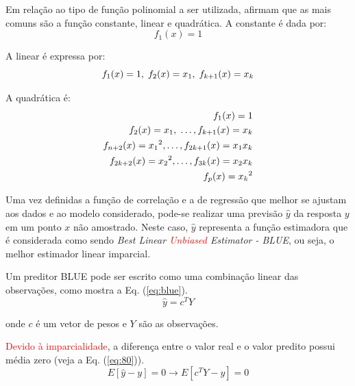 Em relação ao tipo de função polinomial a ser utilizada,  afirmam que as mais comuns são a função constante, linear e quadrática. A constante é dada por:
\begin{equation}
{f}_1({x}) = 1
\label{eq:24}
\end{equation}

A linear é expressa por:
\begin{equation}
{f}_1(x) = 1, \hspace{0.1 cm} {f}_2(x) ={x}_1, \hspace{0.1 cm} {f}_{k+1}(x) ={x}_k
\label{eq:25}
\end{equation}

A quadrática é:
\begin{equation}
\begin{split}
{f}_1(x) = 1\\
{f}_2(x) = {x}_1, \hspace{0.1 cm}  \ldots, {f}_{k+1}(x) = {x}_k\\
{f}_{n+2}(x) = {{x}_1}^2,  \ldots,  {f}_{2k+1}(x) = {x}_1 {x}_k\\
{f}_{2k+2}(x) = {{x}_2}^2,  \ldots, {f}_{3k}(x) = {x}_2 {x}_k \\
{f}_{p}(x) = {{x}_k}^2
\label{eq:30}
\end{split}
\end{equation}

Uma vez definidas a função de correlação e a de regressão que melhor se ajustam aos dados e ao modelo considerado, pode-se realizar uma previsão $\hat{y}$ da resposta $y$ em um ponto $x$ não amostrado. Neste caso, $\hat{y}$ representa a função estimadora que é considerada como sendo {\it Best Linear \textcolor{red}{Unbiased} Estimator - BLUE}, ou seja, o  melhor estimador linear imparcial.

Um preditor BLUE pode ser escrito como uma combinação linear das observações, como mostra a Eq. (\ref{eq:blue}).
\begin{equation}
\hat{y}= {c}^TY
\label{eq:blue}
\end{equation}	

\noindent onde $c$ é um vetor de pesos e $Y$ são as observações.

\textcolor{red}{Devido à imparcialidade}, a diferença entre o valor real e o valor predito possui média zero (veja a Eq. (\ref{eq:80})).
\begin{equation}
E[\hat{y}-y] = 0 \rightarrow E[{c}^TY-y] = 0 
\label{eq:80}
\end{equation}	

